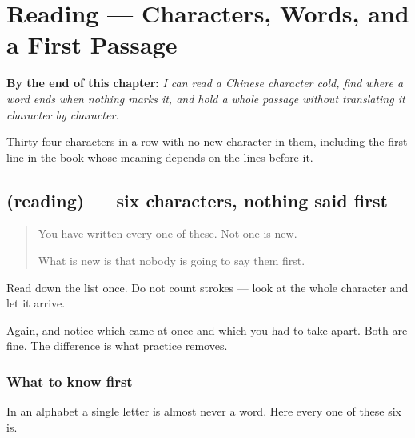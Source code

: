 
\chapter{Reading — Characters, Words, and a First Passage}
\label{ch:zh-diyi-ke}

\begin{chapteropening}
\textbf{By the end of this chapter:} \emph{I can read a Chinese character cold, find where a word ends when nothing marks it, and hold a whole passage without translating it character by character.}

Thirty-four characters in a row with no new character in them, including the first line in the book whose meaning depends on the lines before it.
\end{chapteropening}

\section[(reading)]{(reading) — six characters, nothing said first}

\label{lesson:ZH-C29-characters}



\begin{quote}
You have written every one of these. Not one is new.

What is new is that nobody is going to say them first.
\end{quote}

\begin{tcolorbox}[breakable,skin=enhanced,colback=orange!6,colframe=orange!45!black,boxrule=0.5pt,arc=1mm,left=6pt,right=6pt,top=4pt,bottom=4pt,fonttitle=\bfseries,title={Read this}]
\begin{quote}
     
\end{quote}

Read down the list once. Do not count strokes — look at the whole character and let it arrive.

Again, and notice which came at once and which you had to take apart. Both are fine. The difference is what practice removes.
\end{tcolorbox}

\subsection*{What to know first}
In an alphabet a single letter is almost never a word. Here every one of these six is.

